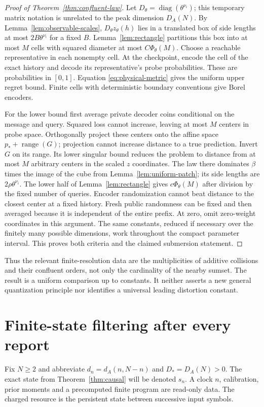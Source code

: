 \documentclass[11pt]{amsart}
\theoremstyle{definition}\newtheorem{definition}[theorem]{Definition}
\theoremstyle{remark}\newtheorem{remark}[theorem]{Remark}
\begin{document}
\begin{proof}[Proof of Theorem~\ref{thm:confluent-law}]
Let $D_\theta=\operatorname{diag}(\theta^{\nu_i})$; this temporary
matrix notation is unrelated to the peak dimension $D_A(N)$.
By Lemma~\ref{lem:observable-scales}, $D_\theta z_\theta(h)$ lies in
a translated box of side lengths at most $2B\theta^{\nu_i}$ for a fixed
$B$. Lemma~\ref{lem:rectangle} partitions this box into at most $M$
cells with squared diameter at most $C\Phi_\theta(M)$. Choose a
reachable representative in each nonempty cell. At the checkpoint,
encode the cell of the exact history and decode its representative's
probe probabilities. These are probabilities in $[0,1]$. Equation
\eqref{eq:physical-metric} gives the uniform upper regret bound.
Finite cells with deterministic boundary conventions give Borel encoders.

For the lower bound first average private decoder coins conditional on
the message and query. Squared loss cannot increase, leaving at most
$M$ centers in probe space. Orthogonally project these centers onto the
affine space $p_*+\operatorname{range}(G)$; projection cannot increase
distance to a true prediction. Invert $G$ on its range. Its lower singular
bound reduces the problem to distance from at most $M$ arbitrary centers
in the scaled $z$ coordinates. The law there dominates $\beta$ times
the image of the cube from Lemma~\ref{lem:uniform-patch}; its side lengths
are $2\rho\theta^{\nu_i}$. The lower half of
Lemma~\ref{lem:rectangle} gives $c\Phi_\theta(M)$ after division by
the fixed number of queries. Encoder randomization cannot beat distance
to the closest center at a fixed history. Fresh public randomness can be
fixed and then averaged because it is independent of the entire prefix.
At zero, omit zero-weight coordinates in this argument. The same constants,
reduced if necessary over the finitely many possible dimensions, work
throughout the compact parameter interval. This proves both criteria and
the claimed submersion statement.
\end{proof}

Thus the relevant finite-resolution data are the multiplicities of additive
collisions and their confluent orders, not only the cardinality of the
nearby sumset. The result is a uniform comparison up to constants. It
neither asserts a new general quantization principle nor identifies a
universal leading distortion constant.

\section{Finite-state filtering after every report}\label{sec:streaming}
Fix $N\ge2$ and abbreviate $d_n=d_A(n,N-n)$ and $D_*=D_A(N)>0$.
The exact state from Theorem~\ref{thm:causal} will be denoted $s_n$.
A clock $n$, calibration, prior moments and a precomputed finite program
are read-only data. The charged resource is the persistent state between
successive input symbols.
\end{document}

